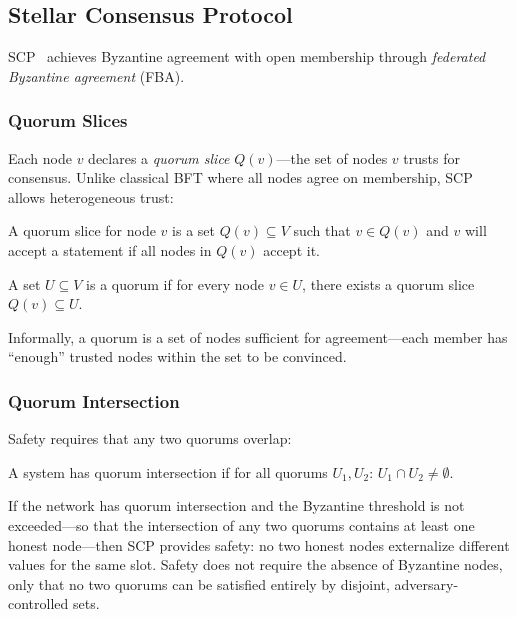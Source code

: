 

\subsection{Stellar Consensus Protocol}
\label{sec:scp}

SCP~\cite{scp} achieves Byzantine agreement with open membership through
\textit{federated Byzantine agreement} (FBA).

\subsubsection{Quorum Slices}

Each node $v$ declares a \textit{quorum slice} $Q(v)$---the set of nodes
$v$ trusts for consensus. Unlike classical BFT where all nodes agree on
membership, SCP allows heterogeneous trust:

\begin{definition}
A quorum slice for node $v$ is a set $Q(v) \subseteq V$ such that $v \in Q(v)$
and $v$ will accept a statement if all nodes in $Q(v)$ accept it.
\end{definition}

\begin{definition}[Quorum]
A set $U \subseteq V$ is a quorum if for every node $v \in U$, there exists
a quorum slice $Q(v) \subseteq U$.
\end{definition}

Informally, a quorum is a set of nodes sufficient for agreement---each member
has ``enough'' trusted nodes within the set to be convinced.

\subsubsection{Quorum Intersection}

Safety requires that any two quorums overlap:

\begin{definition}
A system has quorum intersection if for all quorums $U_1, U_2$:
$U_1 \cap U_2 \neq \emptyset$.
\end{definition}

\begin{theorem}
If the network has quorum intersection and the Byzantine threshold is not
exceeded---so that the intersection of any two quorums contains at least one
honest node---then SCP provides safety: no two honest nodes externalize
different values for the same slot. Safety does not require the absence of
Byzantine nodes, only that no two quorums can be satisfied entirely by
disjoint, adversary-controlled sets.
\end{theorem}

